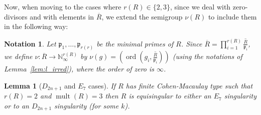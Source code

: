 \documentclass{article}
\newtheorem{lemma}[theorem]{Lemma}
\newtheorem{notation}[theorem]{Notation}
\DeclareMathOperator{\ord}{ord}
\DeclareMathOperator{\mult}{mult}
\numberwithin{theorem}{section}
\begin{document}
Now, when moving to the cases where $r(R) \in \{2,3\}$, since we deal with zero-divisors and with elements in $\overline{R}$, we extend the semigroup $\nu(R)$ to include them in the following way:

\begin{notation}
    Let $\mathfrak{p}_1, \dots, \mathfrak{p}_{r(r)}$ be the minimal primes of $R$. Since $\overline{R} = \prod_{i=1}^{r(R)} \overline{\frac{R}{\mathfrak{p}_i}}$, we define $\nu \colon \overline{R} \to \mathbb{N}_\infty^{r(R)}$ by $\nu(g)=\left(\ord(g_i, \overline{\frac{R}{\mathfrak{p}_i}})\right)$ (using the notations of Lemma~\ref{lem:l_irred}), where the order of zero is $\infty$.
\end{notation}

\begin{lemma}[$D_{2n+1}$ and $E_7$ cases]\label{lem:equi3,2}
    If $R$ has finite Cohen-Macaulay type such that $r(R)=2$ and $\mult(R)=3$ then $R$ is equisingular to either an $E_7$ singularity or to an $D_{2n+1}$ singularity (for some $k$).
\end{lemma}
\end{document}
